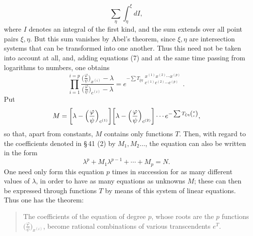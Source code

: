 \documentclass[10pt]{article}
\begin{document}
\[
\sum_\eta\int_\eta^\xi dI,
\]
where \(I\) denotes an integral of the first kind, and the sum extends over all point pairs \(\xi,\eta\). But this sum vanishes by Abel's theorem, since \(\xi,\eta\) are intersection systems that can be transformed into one another. Thus this need not be taken into account at all, and, adding equations (7) and at the same time passing from logarithms to numbers, one obtains
\[
\prod_{i=1}^{i=p}
\frac{\bigl(\frac{\varphi}{\psi}\bigr)_{x^{(i)}}-\lambda}
{\bigl(\frac{\varphi}{\psi}\bigr)_{c^{(i)}}-\lambda}
=e^{-\sum T_{\xi\eta}\begin{smallmatrix}x^{(1)}x^{(2)}\cdots x^{(p)}\\c^{(1)}c^{(2)}\cdots c^{(p)}\end{smallmatrix}}.
\]
Put
\[
M=\biggl[\lambda-\Bigl(\frac{\varphi}{\psi}\Bigr)_{c^{(1)}}\biggr]
\biggl[\lambda-\Bigl(\frac{\varphi}{\psi}\Bigr)_{c^{(2)}}\biggr]
\cdots e^{-\sum T_{\xi\eta}\binom{x}{c}},
\]
so that, apart from constants, \(M\) contains only functions \(T\). Then, with regard to the coefficients denoted in \S\,41 (2) by \(M_1,M_2\ldots\), the equation can also be written in the form
\[
\lambda^p+M_1\lambda^{p-1}+\cdots+M_p=N.
\]
One need only form this equation \(p\) times in succession for as many different values of \(\lambda\), in order to have as many equations as unknowns \(M\); these can then be expressed through functions \(T\) by means of this system of linear equations. Thus one has the theorem:

\begin{quote}
The coefficients of the equation of degree \(p\), whose roots are the \(p\) functions \(\bigl(\frac{\varphi}{\psi}\bigr)_{x^{(i)}}\), become rational combinations of various transcendents \(e^T\).
\end{quote}
\end{document}
